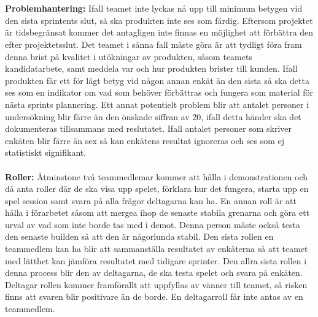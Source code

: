 \documentclass[10pt]{article}
\begin{document}
	\\\\
	\textbf{Problemhantering:} Ifall teamet inte lyckas nå upp till minimum betygen vid den sista sprintents slut, så ska produkten inte ses som färdig. Eftersom projektet är tidsbegränsat kommer det antagligen inte finnas en möjlighet att förbättra den efter projektetsslut. Det teamet i sånna fall måste göra är att tydligt föra fram denna brist på kvalitet i utökningar av produkten, såsom teamets kandidatarbete, samt meddela var och hur produkten brister till kunden.
	Ifall produkten får ett för lågt betyg vid någon annan enkät än den sista så ska detta ses som en indikator om vad som behöver förbättras och fungera som material för nästa sprints plannering.
	Ett annat potentielt problem blir att antalet personer i undersökning blir färre än den önskade siffran av 20, ifall detta händer ska det dokumenteras tillsammans med reslutatet. Ifall antalet personer som skriver enkäten blir färre än sex så kan enkätens resultat ignoreras och ses som ej statistiskt signifikant.
	\\\\
	\textbf{Roller:} Åtminstone två teammedlemar kommer att hålla i demonstrationen och då anta roller där de ska visa upp spelet, förklara hur det fungera, starta upp en spel session samt svara på alla frågor deltagarna kan ha. En annan roll är att hålla i förarbetet såsom att mergea ihop de senaste stabila grenarna och göra ett urval av vad som inte borde tas med i demot. Denna person måste också testa den senaste builden så att den är någorlunda stabil. Den sista rollen en teammedlem kan ha blir att sammanställa resultatet av enkäterna så att teamet med lätthet kan jämföra resultatet med tidigare sprinter.	Den allra sista rollen i denna process blir den av deltagarna, de ska testa spelet och svara på enkäten. Deltagar rollen kommer framförallt att uppfyllas av vänner till teamet, så risken finns att svaren blir positivare än de borde. En deltagarroll får inte antas av en teammedlem.
	
	
\end{document}
